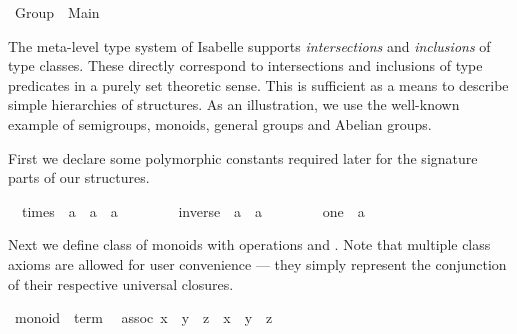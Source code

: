 %
\begin{isabellebody}%
\def\isabellecontext{Group}%
%
\ Group\ {\isacharequal}\ Main{\isacharcolon}%
\begin{isamarkuptext}%
\medskip\noindent The meta-level type system of Isabelle supports
 \emph{intersections} and \emph{inclusions} of type classes. These
 directly correspond to intersections and inclusions of type
 predicates in a purely set theoretic sense. This is sufficient as a
 means to describe simple hierarchies of structures.  As an
 illustration, we use the well-known example of semigroups, monoids,
 general groups and Abelian groups.%
\end{isamarkuptext}%
%
%
\begin{isamarkuptext}%
First we declare some polymorphic constants required later for the
 signature parts of our structures.%
\end{isamarkuptext}%
\isanewline
\ \ times\ {\isacharcolon}{\isacharcolon}\ {\isachardoublequote}{\isacharprime}a\ {\isasymRightarrow}\ {\isacharprime}a\ {\isasymRightarrow}\ {\isacharprime}a{\isachardoublequote}\ \ \ \ {\isacharparenleft}\ {\isachardoublequote}{\isasymodot}{\isachardoublequote}\ {}{}{\isacharparenright}\isanewline
\ \ inverse\ {\isacharcolon}{\isacharcolon}\ {\isachardoublequote}{\isacharprime}a\ {\isasymRightarrow}\ {\isacharprime}a{\isachardoublequote}\ \ \ \ {\isacharparenleft}{\isachardoublequote}{\isacharparenleft}{\isacharunderscore}{\isasyminv}{\isacharparenright}{\isachardoublequote}\ {\isacharbrackleft}{}{}{}{}{\isacharbrackright}\ {}{}{}{\isacharparenright}\isanewline
\ \ one\ {\isacharcolon}{\isacharcolon}\ {\isacharprime}a\ \ \ \ {\isacharparenleft}{\isachardoublequote}{\isasymunit}{\isachardoublequote}{\isacharparenright}%
\begin{isamarkuptext}%
\noindent Next we define class  of monoids with
 operations \isa{{\isasymodot}} and \isa{{\isasymunit}}.  Note that multiple class
 axioms are allowed for user convenience --- they simply represent the
 conjunction of their respective universal closures.%
\end{isamarkuptext}%
\ monoid\ {\isacharless}\ {\isachardoublequote}term{\isachardoublequote}\isanewline
\ \ assoc{\isacharcolon}\ {\isachardoublequote}{\isacharparenleft}x\ {\isasymodot}\ y{\isacharparenright}\ {\isasymodot}\ z\ {\isacharequal}\ x\ {\isasymodot}\ {\isacharparenleft}y\ {\isasymodot}\ z{\isacharparenright}{\isachardoublequote}\isanewline

\end{isabellebody}
